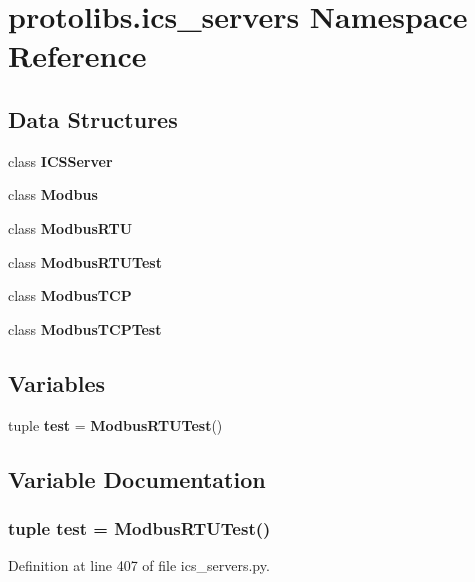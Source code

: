 \section{protolibs.\+ics\+\_\+servers Namespace Reference}
\label{namespaceprotolibs_1_1ics__servers}
\subsection*{Data Structures}
\begin{DoxyCompactItemize}
\item 
class {\bf I\+C\+S\+Server}
\item 
class {\bf Modbus}
\item 
class {\bf Modbus\+R\+T\+U}
\item 
class {\bf Modbus\+R\+T\+U\+Test}
\item 
class {\bf Modbus\+T\+C\+P}
\item 
class {\bf Modbus\+T\+C\+P\+Test}
\end{DoxyCompactItemize}
\subsection*{Variables}
\begin{DoxyCompactItemize}
\item 
tuple {\bf test} = {\bf Modbus\+R\+T\+U\+Test}()
\end{DoxyCompactItemize}


\subsection{Variable Documentation}
\subsubsection[{test}]{\setlength{\rightskip}{0pt plus 5cm}tuple test = {\bf Modbus\+R\+T\+U\+Test}()}\label{namespaceprotolibs_1_1ics__servers_ae2be30e6b14c541b72cb62bdb6169fab}


Definition at line 407 of file ics\+\_\+servers.\+py.

